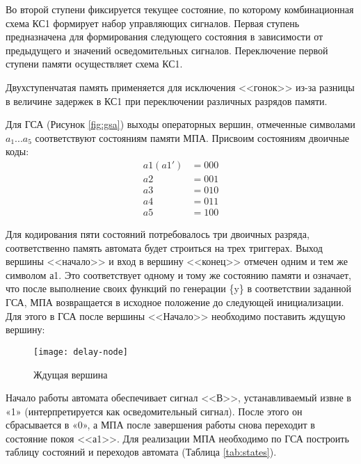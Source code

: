 \documentclass[a4paper,14pt]{extarticle}
\begin{document}
Во второй ступени фиксируется текущее состояние, по которому комбинационная
схема КС1 формирует набор управляющих сигналов. Первая ступень предназначена
для формирования следующего состояния в зависимости от предыдущего и
значений осведомительных сигналов. Переключение первой ступени памяти осуществляет схема КС1.

Двухступенчатая память применяется для исключения
<<гонок>> из-за разницы в величине задержек в КС1 при переключении различных разрядов памяти.

Для ГСА (Рисунок \ref{fig:gsa}) выходы операторных вершин, отмеченные символами $a_1 ... a_5$ соответствуют состояниям памяти МПА. Присвоим состояниям двоичные коды:
\begin{align*}
 	a1(a1') &= 000 \\
 	a2 &= 001 \\ 
 	a3 &= 010 \\
 	 a4 &= 011 \\
 	 a5 &= 100
\end{align*}


Для кодирования пяти состояний потребовалось три двоичных разряда, 
соответственно память автомата будет строиться на трех триггерах.
Выход вершины <<начало>> и вход в вершину <<конец>> отмечен одним и
тем же символом а1. Это соответствует одному и тому же состоянию памяти и
означает, что после выполнение своих функций по генерации \{y\} в соответствии заданной ГСА, МПА возвращается в исходное положение до следующей
инициализации. Для этого в ГСА после вершины <<Начало>> необходимо поставить ждущую вершину:

\begin{figure}[htbp]
	\centering
	\texttt{[image: delay-node]}
	\caption{Ждущая вершина}
	\label{fig:delay-node}
\end{figure}

Начало работы автомата обеспечивает сигнал <<В>>, устанавливаемый
извне в «1» (интерпретируется как осведомительный сигнал). После этого
он сбрасывается в «0», а МПА после завершения работы снова переходит
в состояние покоя <<а1>>.
Для реализации МПА необходимо по ГСА построить таблицу состояний
и переходов автомата (Таблица \ref{tab:states}). 
\end{document}

